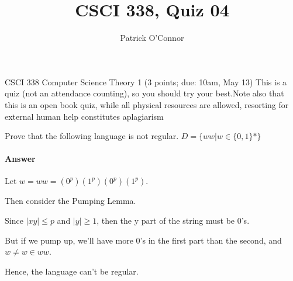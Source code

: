 \documentclass{article}
\title{CSCI 338, Quiz 04}
\author{Patrick O'Connor}
\begin{document}
\maketitle

CSCI 338 Computer Science Theory
1 (3 points; due: 10am, May 13)
This is a quiz (not an attendance counting), so you should 
try your best.Note also that this is an open book quiz, 
while all physical resources are allowed, resorting for external human 
help constitutes aplagiarism


Prove that the following language is not regular.
$D =\{ww|w\in\{0,1\}*\}$
\paragraph{Answer}

Let $w=ww =(0^p)(1^p)(0^p)(1^p)$. 

Then consider the Pumping Lemma. 

Since $|xy| \leq p$ and $|y| \geq 1$, then the y part of the string must be 0's. 

But if we pump up, we'll have more 0's in the first part than the second, 
and $w\neq w \in ww$.

Hence, the language can't be regular.
\end{document}
